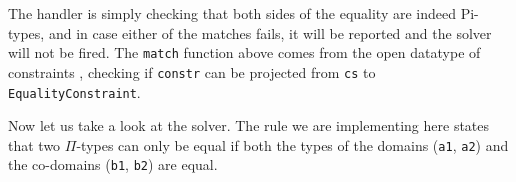The handler is simply checking that both sides of the equality are
indeed Pi-types, and in case either of the matches fails, it will be
reported and the solver will not be fired. The \texttt{match} function
above comes from the open datatype of constraints
\citep[sec.~5]{swierstraDataTypesCarte2008}, checking if \texttt{constr}
can be projected from \texttt{cs} to \texttt{EqualityConstraint}.

Now let us take a look at the solver. The rule we are implementing here
states that two \(\Pi\)-types can only be equal if both the types of the
domains (\texttt{a1}, \texttt{a2}) and the co-domains (\texttt{b1},
\texttt{b2}) are equal.

\begin{imageonly}
\begin{Shaded}
\begin{Highlighting}[]
\NormalTok{ (} \OperatorTok{:\textless{}:}
                      \OtherTok{=\textgreater{}} 
\OtherTok{=} 
  \NormalTok{ (}\NormalTok{ (}\NormalTok{ (}
\NormalTok{                                (}\OtherTok{=}
\OtherTok{\textless{}{-}}
\OtherTok{\textless{}{-}}
\OtherTok{\textless{}{-}}
  \OtherTok{=}
\OtherTok{=}
\OtherTok{\textless{}{-}}\NormalTok{ (}\OperatorTok{$}
  \OtherTok{=}\OperatorTok{$}
   
\end{Highlighting}
\end{Shaded}
\end{imageonly}

